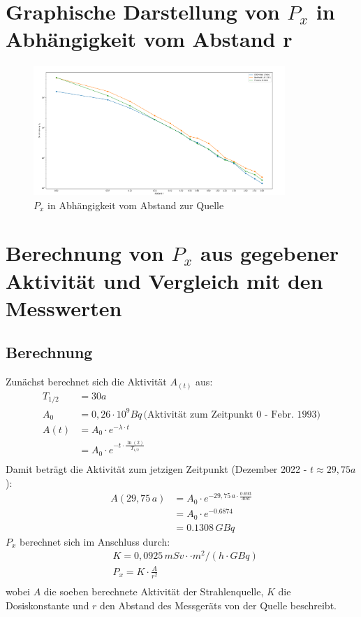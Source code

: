 \documentclass[12pt,german]{article}
\begin{document}
    \section{Graphische Darstellung von $P_x$ in Abhängigkeit vom Abstand r}
    \begin{figure}[H]
        \centering
        \includegraphics[width=0.85\textwidth]{03_Dosisleistung.png}
        \caption{$P_x$ in Abhängigkeit vom Abstand zur Quelle}
    \end{figure}


    \section{Berechnung von $P_x$ aus gegebener Aktivität und Vergleich mit den Messwerten}
    \subsection{Berechnung}
    Zunächst berechnet sich die Aktivität \(A_(t)\) aus:
    \begin{align*}
        T_{1/2} &= 30a \\
        A_0 &= 0,26 \cdot 10^9 Bq \, \text{(Aktivität zum Zeitpunkt 0 - Febr. 1993)} \\
        A(t) &= A_0 \cdot e^{-\lambda \cdot t} \\
        &= A_0 \cdot e^{-t \cdot \frac{\ln(2)}{T_{1/2}}} \\
    \end{align*}
    Damit beträgt die Aktivität zum jetzigen Zeitpunkt (Dezember 2022 - \( t \approx 29,75 a \)):
    \begin{align*}
        A(29,75\, a) &= A_0 \cdot e^{-29,75\, a \cdot \frac{0.693}{30\, a}} \\
                     &= A_0 \cdot e^{-0.6874} \\
                     &= 0.1308\, GBq
    \end{align*}
    $P_x$ berechnet sich im Anschluss durch:
    \begin{align*}
        &K = 0,0925\, mSv·\cdot m^2 / (h \cdot GBq) \\
        &P_x = K \cdot \frac{A}{r^2} \\
    \end{align*}
    wobei $A$ die soeben berechnete Aktivität der Strahlenquelle, $K$ die Dosiskonstante und $r$ den Abstand des Messgeräts von der Quelle beschreibt.
\end{document}
